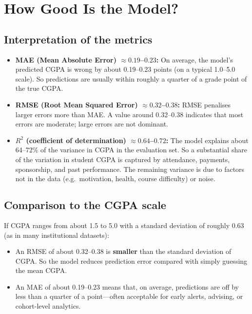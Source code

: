 \documentclass[12pt,a4paper]{article}
\begin{document}
\section{How Good Is the Model?}

\subsection{Interpretation of the metrics}

\begin{itemize}
  \item \textbf{MAE (Mean Absolute Error) \(\approx 0.19\)--\(0.23\):} On average, the model's predicted CGPA is wrong by about 0.19--0.23 points (on a typical 1.0--5.0 scale). So predictions are usually within roughly a quarter of a grade point of the true CGPA.
  \item \textbf{RMSE (Root Mean Squared Error) \(\approx 0.32\)--\(0.38\):} RMSE penalises larger errors more than MAE. A value around 0.32--0.38 indicates that most errors are moderate; large errors are not dominant.
  \item \textbf{\(R^2\) (coefficient of determination) \(\approx 0.64\)--\(0.72\):} The model explains about 64--72\% of the variance in CGPA in the evaluation set. So a substantial share of the variation in student CGPA is captured by attendance, payments, sponsorship, and past performance. The remaining variance is due to factors not in the data (e.g.\ motivation, health, course difficulty) or noise.
\end{itemize}

\subsection{Comparison to the CGPA scale}

If CGPA ranges from about 1.5 to 5.0 with a standard deviation of roughly 0.63 (as in many institutional datasets):

\begin{itemize}
  \item An RMSE of about 0.32--0.38 is \textbf{smaller} than the standard deviation of CGPA. So the model reduces prediction error compared with simply guessing the mean CGPA.
  \item An MAE of about 0.19--0.23 means that, on average, predictions are off by less than a quarter of a point---often acceptable for early alerts, advising, or cohort-level analytics.
\end{itemize}
\end{document}
